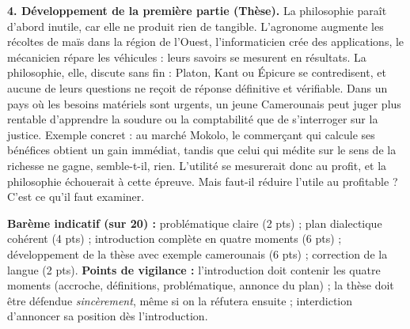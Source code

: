 \documentclass[11pt]{article}
\begin{document}
\begin{corrige}
\textbf{4. Développement de la première partie (Thèse).} La philosophie paraît d'abord inutile, car elle ne produit rien de tangible. L'agronome augmente les récoltes de maïs dans la région de l'Ouest, l'informaticien crée des applications, le mécanicien répare les véhicules : leurs savoirs se mesurent en résultats. La philosophie, elle, discute sans fin : Platon, Kant ou Épicure se contredisent, et aucune de leurs questions ne reçoit de réponse définitive et vérifiable. Dans un pays où les besoins matériels sont urgents, un jeune Camerounais peut juger plus rentable d'apprendre la soudure ou la comptabilité que de s'interroger sur la justice. Exemple concret : au marché Mokolo, le commerçant qui calcule ses bénéfices obtient un gain immédiat, tandis que celui qui médite sur le sens de la richesse ne gagne, semble-t-il, rien. L'utilité se mesurerait donc au profit, et la philosophie échouerait à cette épreuve. Mais faut-il réduire l'utile au profitable ? C'est ce qu'il faut examiner.

\textbf{Barème indicatif (sur 20) :} problématique claire (2 pts) ; plan dialectique cohérent (4 pts) ; introduction complète en quatre moments (6 pts) ; développement de la thèse avec exemple camerounais (6 pts) ; correction de la langue (2 pts).
\textbf{Points de vigilance :} l'introduction doit contenir les quatre moments (accroche, définitions, problématique, annonce du plan) ; la thèse doit être défendue \emph{sincèrement}, même si on la réfutera ensuite ; interdiction d'annoncer sa position dès l'introduction.
\end{corrige}
\end{document}
